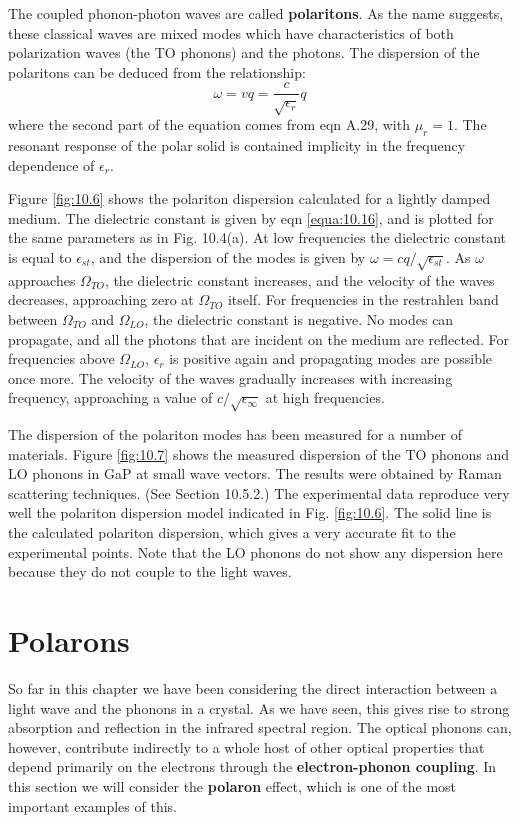 \documentclass[12pt]{book}
\begin{document}
The coupled phonon-photon waves are called \textbf{polaritons}. As the name suggests, these classical waves are mixed modes which have characteristics of both polarization waves (the TO phonons) and the photons. The dispersion of the polaritons can be deduced from the relationship:
\begin{equation}\label{equa:10.19}
  \omega=vq=\frac{c}{\sqrt{\epsilon_r}}q
\end{equation}
where the second part of the equation comes from eqn A.29, with $\mu_r = 1$. The resonant response of the polar solid is contained implicity in the frequency dependence of $\epsilon_r$.

Figure \ref{fig:10.6} shows the polariton dispersion calculated for a lightly damped medium. The dielectric constant is given by eqn \ref{equa:10.16}, and is plotted for the same parameters as in Fig. 10.4(a). At low frequencies the dielectric constant is equal to $\epsilon_{st}$, and the dispersion of the modes is given by $\omega=cq/\sqrt{\epsilon_{st}}$. As $\omega$ approaches $\Omega_{TO}$, the dielectric constant increases, and the velocity of the waves decreases, approaching zero at $\Omega_{TO}$ itself. For frequencies in the restrahlen band between $\Omega_{TO}$ and $\Omega_{LO}$, the dielectric constant is negative. No modes can propagate, and all the photons that are incident on the medium are reflected. For frequencies above $\Omega_{LO}$, $\epsilon_r$ is positive again and propagating modes are possible once more. The velocity of the waves gradually increases with increasing frequency, approaching a value of $c/\sqrt{\epsilon_{\infty}}$ at high frequencies.

The dispersion of the polariton modes has been measured for a number of materials. Figure \ref{fig:10.7} shows the measured dispersion of the TO phonons and LO phonons in GaP at small wave vectors. The results were obtained by Raman scattering techniques. (See Section 10.5.2.) The experimental data reproduce very well the polariton dispersion model indicated in Fig. \ref{fig:10.6}. The solid line is the calculated polariton dispersion, which gives a very accurate fit to the experimental points. Note that the LO phonons do not show any dispersion here because they do not couple to the light waves.

\section{Polarons}

So far in this chapter we have been considering the direct interaction between a light wave and the phonons in a crystal. As we have seen, this gives rise to strong absorption and reflection in the infrared spectral region. The optical phonons can, however, contribute indirectly to a whole host of other optical properties that depend primarily on the electrons through the \textbf{electron-phonon coupling}. In this section we will consider the \textbf{polaron} effect, which is one of the most important examples of this.
\end{document}
